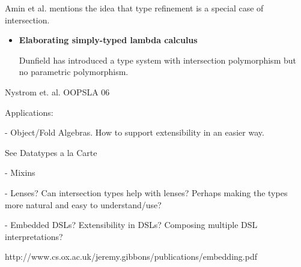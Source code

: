 Amin et al. mentions the idea that type refinement is a special case of
intersection. \cite{amin2014foundations,amin2012dependent}

\begin{itemize}

\item{\bf Elaborating simply-typed lambda calculus}

  Dunfield has introduced a type system with intersection polymorphism but no
  parametric polymorphism.

\end{itemize}

Nystrom et. al. OOPSLA 06

Applications:

- Object/Fold Algebras. How to support extensibility in an easier way.

See Datatypes a la Carte

- Mixins

- Lenses? Can intersection types help with lenses? Perhaps making the
types more natural and easy to understand/use?

- Embedded DSLs? Extensibility in DSLs? Composing multiple DSL interpretations?

http://www.cs.ox.ac.uk/jeremy.gibbons/publications/embedding.pdf
